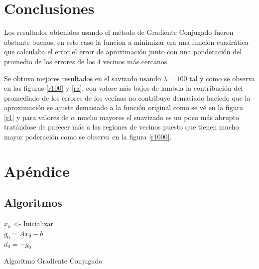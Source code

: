 \documentclass[conference]{IEEEtran}
\begin{document}
\section{Conclusiones}

Los resultados obtenidos usando el método de Gradiente Conjugado fueron abstante buenos, en este
caso la funcion a minimizar era una función cuadrática que calculaba el error el error de
aproximación junto con una ponderación del promedio de los errores de los 4 vecinos más cercanos.

Se obtuvo mejores resultados en el savizado usando $\lambda=100$ tal y como se observa en las
figuras \ref{r100} y \ref{ra}, con valore más bajos de lambda la contribución del promediado de los
errores de los vecinas no contribuye demasiado haciedo que la aproximación se ajuste demasiado a la
función original como se vé en la figura \ref{r1} y para valores de $\alpha$ mucho mayores el
suavizado es un poco más abrupto tratándose de parecer más a las regiones de vecinos puesto que
tienen mucho mayor poderación como se observa en la figura \ref{r1000}.

\newpage

\section{Apéndice}

\subsection{Algoritmos}


\begin{algorithm}[h]
    \SetAlgoLined
	$x_k$ <- Inicializar \\
	$g_0 = Ax_0 - b$ \\
	$d_0 = -g_0$
    \caption{Algoritmo Gradiente Conjugado}
\end{algorithm}
\end{document}
